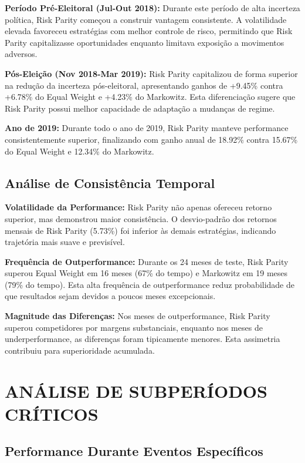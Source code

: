 \textbf{Período Pré-Eleitoral (Jul-Out 2018):} Durante este período de alta incerteza política, Risk Parity começou a construir vantagem consistente. A volatilidade elevada favoreceu estratégias com melhor controle de risco, permitindo que Risk Parity capitalizasse oportunidades enquanto limitava exposição a movimentos adversos.

\textbf{Pós-Eleição (Nov 2018-Mar 2019):} Risk Parity capitalizou de forma superior na redução da incerteza pós-eleitoral, apresentando ganhos de +9.45\% contra +6.78\% do Equal Weight e +4.23\% do Markowitz. Esta diferenciação sugere que Risk Parity possui melhor capacidade de adaptação a mudanças de regime.

\textbf{Ano de 2019:} Durante todo o ano de 2019, Risk Parity manteve performance consistentemente superior, finalizando com ganho anual de 18.92\% contra 15.67\% do Equal Weight e 12.34\% do Markowitz.

\subsection{Análise de Consistência Temporal}

\textbf{Volatilidade da Performance:} Risk Parity não apenas ofereceu retorno superior, mas demonstrou maior consistência. O desvio-padrão dos retornos mensais de Risk Parity (5.73\%) foi inferior às demais estratégias, indicando trajetória mais suave e previsível.

\textbf{Frequência de Outperformance:} Durante os 24 meses de teste, Risk Parity superou Equal Weight em 16 meses (67\% do tempo) e Markowitz em 19 meses (79\% do tempo). Esta alta frequência de outperformance reduz probabilidade de que resultados sejam devidos a poucos meses excepcionais.

\textbf{Magnitude das Diferenças:} Nos meses de outperformance, Risk Parity superou competidores por margens substanciais, enquanto nos meses de underperformance, as diferenças foram tipicamente menores. Esta assimetria contribuiu para superioridade acumulada.

\section{ANÁLISE DE SUBPERÍODOS CRÍTICOS}

\subsection{Performance Durante Eventos Específicos}

